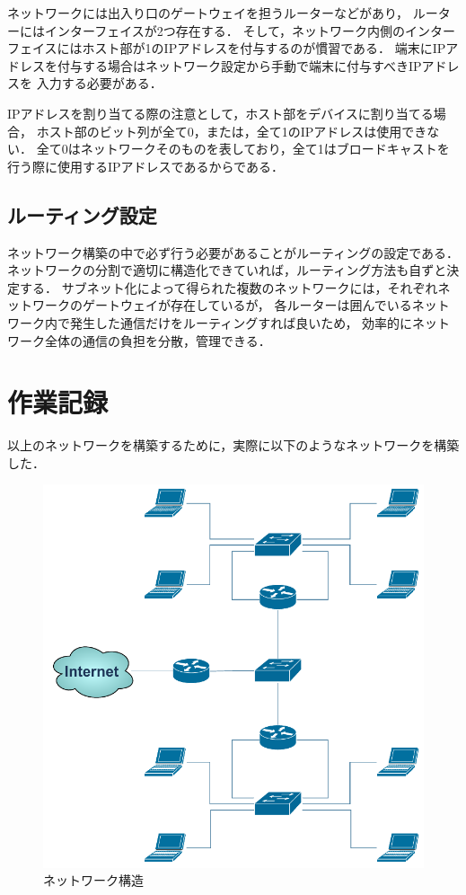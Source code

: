 \documentclass{jlreq}
\begin{document}
ネットワークには出入り口のゲートウェイを担うルーターなどがあり，
ルーターにはインターフェイスが2つ存在する．
そして，ネットワーク内側のインターフェイスにはホスト部が1のIPアドレスを付与するのが慣習である．
端末にIPアドレスを付与する場合はネットワーク設定から手動で端末に付与すべきIPアドレスを
入力する必要がある．

IPアドレスを割り当てる際の注意として，ホスト部をデバイスに割り当てる場合，
ホスト部のビット列が全て0，または，全て1のIPアドレスは使用できない．
全て0はネットワークそのものを表しており，全て1はブロードキャストを行う際に使用するIPアドレスであるからである．

\subsection*{ルーティング設定}
ネットワーク構築の中で必ず行う必要があることがルーティングの設定である．
ネットワークの分割で適切に構造化できていれば，ルーティング方法も自ずと決定する．
サブネット化によって得られた複数のネットワークには，それぞれネットワークのゲートウェイが存在しているが，
各ルーターは囲んでいるネットワーク内で発生した通信だけをルーティングすれば良いため，
効率的にネットワーク全体の通信の負担を分散，管理できる．


\section{作業記録}

以上のネットワークを構築するために，実際に以下のようなネットワークを構築した．

\begin{figure}
    \centering
    \includegraphics[]{network_structure.pdf}
    \caption{ネットワーク構造}
\end{figure}
\end{document}
